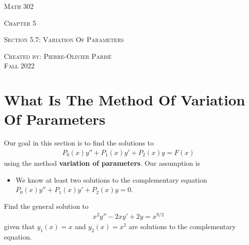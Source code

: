 \documentclass[12pt,a4paper]{article}
\newcounter{example}[section]
\begin{document}
\thispagestyle{empty}

\begin{center}
\vspace*{2.5cm}

{\Huge \textsc{Math 302}}

\vspace*{2cm}

{\LARGE \textsc{Chapter 5}} 

\vspace*{0.75cm}

\noindent\textsc{Section 5.7: Variation Of Parameters}

\vspace*{0.75cm}

\tableofcontents

\vfill

\noindent \textsc{Created by: Pierre-Olivier Paris{\'e}} \\
\textsc{Fall 2022}
\end{center}

\newpage

\section{What Is The Method Of Variation Of Parameters}

Our goal in this section is to find the solutions to 
	\begin{align*}
	P_0(x) y'' + P_1 (x) y' + P_2 (x) y = F(x)
	\end{align*}
using the method \textbf{variation of parameters}. Our assumption is
	\begin{itemize}
	\item We know at least two solutions to the complementary equation $P_0 (x) y'' + P_1 (x) y' + P_2 (x) y = 0$.
	\end{itemize}

\begin{example}
Find the general solution to
	\begin{align*}
	x^2 y'' - 2x y' + 2y = x^{9/2}
	\end{align*}
given that $y_1 (x) = x$ and $y_2 (x) = x^2$ are solutions to the complementary equation.
\end{example}

\newpage
\end{document}

